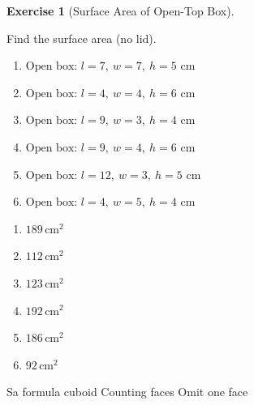 \documentclass[
  letterpaper,
  DIV=11,
  numbers=noendperiod]{scrreprt}
\theoremstyle{definition}
\newtheorem{exercise}{Exercise}[chapter]
\theoremstyle{remark}
\begin{document}
\begin{exercise}[Surface Area of Open-Top
Box]\protect\hypertarget{exr-sa-2}{}\label{exr-sa-2}

Find the surface area (no lid).

\begin{enumerate}
\def\labelenumi{\alph{enumi})}
\item
  \(\text{Open box: }l=7,\ w=7,\ h=5\text{ cm}\)
\item
  \(\text{Open box: }l=4,\ w=4,\ h=6\text{ cm}\)
\item
  \(\text{Open box: }l=9,\ w=3,\ h=4\text{ cm}\)
\item
  \(\text{Open box: }l=9,\ w=4,\ h=6\text{ cm}\)
\item
  \(\text{Open box: }l=12,\ w=3,\ h=5\text{ cm}\)
\item
  \(\text{Open box: }l=4,\ w=5,\ h=4\text{ cm}\)
\end{enumerate}

\begin{tcolorbox}[enhanced jigsaw, opacitybacktitle=0.6, coltitle=black, arc=.35mm, colframe=quarto-callout-tip-color-frame, colback=white, bottomrule=.15mm, left=2mm, colbacktitle=quarto-callout-tip-color!10!white, titlerule=0mm, opacityback=0, title=\textcolor{quarto-callout-tip-color}{\faLightbulb}\hspace{0.5em}{🔍 View Solution}, leftrule=.75mm, breakable, rightrule=.15mm, bottomtitle=1mm, toptitle=1mm, toprule=.15mm]

\begin{enumerate}
\def\labelenumi{\alph{enumi})}
\item
  \(189\,\text{cm}^{2}\)
\item
  \(112\,\text{cm}^{2}\)
\item
  \(123\,\text{cm}^{2}\)
\item
  \(192\,\text{cm}^{2}\)
\item
  \(186\,\text{cm}^{2}\)
\item
  \(92\,\text{cm}^{2}\)
\end{enumerate}

\end{tcolorbox}

{Sa formula cuboid} {Counting faces} {Omit one face}

\end{exercise}
\end{document}
